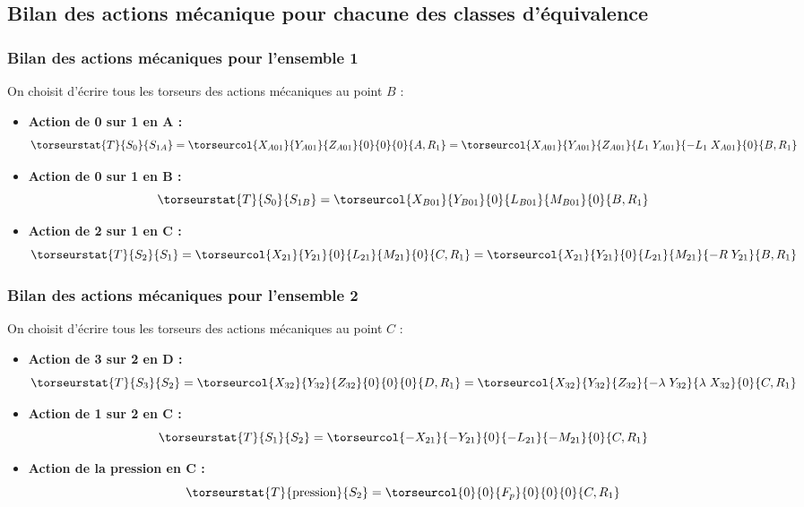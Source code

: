 \subsection*{Bilan des actions mécanique pour chacune des classes d'équivalence}
\subsubsection*{Bilan des actions mécaniques pour l'ensemble 1}
On choisit d'écrire tous les torseurs des actions mécaniques au point $B$ :
\begin{itemize}
\item \textbf{Action de 0 sur 1 en A :}
$$
\torseurstat{T}{S_0}{S_{1A}}
=\torseurcol{X_{A01}}{Y_{A01}}{Z_{A01}}{0}{0}{0}{A,R_1}
=\torseurcol{X_{A01}}{Y_{A01}}{Z_{A01}}{L_1\;Y_{A01}}{-L_1\;X_{A01}}{0}{B,R_1}
$$
\item \textbf{Action de 0 sur 1 en B :}
$$
\torseurstat{T}{S_0}{S_{1B}}
=\torseurcol{X_{B01}}{Y_{B01}}{0}{L_{B01}}{M_{B01}}{0}{B,R_1}
$$
\item \textbf{Action de 2 sur 1 en C :}
$$
\torseurstat{T}{S_2}{S_{1}}
=\torseurcol{X_{21}}{Y_{21}}{0}{L_{21}}{M_{21}}{0}{C,R_1}
=\torseurcol{X_{21}}{Y_{21}}{0}{L_{21}}{M_{21}}{-R\;Y_{21}}{B,R_1}
$$

\end{itemize}

\subsubsection*{Bilan des actions mécaniques pour l'ensemble 2}

On choisit d'écrire tous les torseurs des actions mécaniques au point $C$ :
\begin{itemize}
\item \textbf{Action de 3 sur 2 en D :}\\
$$
\torseurstat{T}{S_3}{S_2}
=\torseurcol{X_{32}}{Y_{32}}{Z_{32}}{0}{0}{0}{D,R_1}
=\torseurcol{X_{32}}{Y_{32}}{Z_{32}}{-\lambda \;Y_{32}}{\lambda \;X_{32}}{0}{C,R_1}
$$
\item \textbf{Action de 1 sur 2 en C :}\\
$$
\torseurstat{T}{S_1}{S_{2}}
=\torseurcol{-X_{21}}{-Y_{21}}{0}{-L_{21}}{-M_{21}}{0}{C,R_1}
$$

\item \textbf{Action de la pression en C :}\\
$$
\torseurstat{T}{\text{pression}}{S_{2}}
=\torseurcol{0}{0}{F_p}{0}{0}{0}{C,R_1}
$$
\end{itemize}

